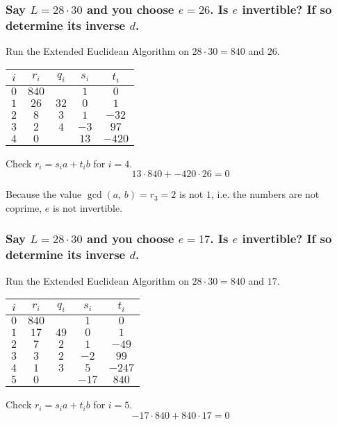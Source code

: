 \documentclass{article}
\begin{document}
  \subsubsection{Say $L = 28 \cdot 30$ and you choose $e = 26$. Is $e$ invertible? If so determine its inverse $d$.}
  Run the Extended Euclidean Algorithm on $28 \cdot 30 = 840$ and $26$.

  \begin{center}
    \begin{tabular}{c|cccc}
      $i$ & $r_i$ & $q_i$ & $s_i$ & $t_i$ \\
      \hline
      $0$ & $840$ &  & $1$ & $0$ \\
      $1$ & $26$ & $32$ & $0$ & $1$ \\
      $2$ & $8$ & $3$ & $1$ & $-32$ \\
      $3$ & $2$ & $4$ & $-3$ & $97$ \\
      $4$ & $0$ &  & $13$ & $-420$ \\
    \end{tabular}
  \end{center}
  Check $r_i = s_ia + t_ib$ for $i = 4$.
  \[ 13 \cdot 840 + -420 \cdot 26 = 0 \]

  Because the value $\gcd(a,\, b) = r_3 = 2$ is not $1$, i.e. the numbers are not coprime, $e$ is not invertible.

  \subsubsection{Say $L = 28 \cdot 30$ and you choose $e = 17$. Is $e$ invertible? If so determine its inverse $d$.}
  Run the Extended Euclidean Algorithm on $28 \cdot 30 = 840$ and $17$.

  \begin{center}
    \begin{tabular}{c|cccc}
      $i$ & $r_i$ & $q_i$ & $s_i$ & $t_i$ \\
      \hline
      $0$ & $840$ &  & $1$ & $0$ \\
      $1$ & $17$ & $49$ & $0$ & $1$ \\
      $2$ & $7$ & $2$ & $1$ & $-49$ \\
      $3$ & $3$ & $2$ & $-2$ & $99$ \\
      $4$ & $1$ & $3$ & $5$ & $-247$ \\
      $5$ & $0$ &  & $-17$ & $840$ \\
    \end{tabular}
  \end{center}
  Check $r_i = s_ia + t_ib$ for $i = 5$.
  \[ -17 \cdot 840 + 840 \cdot 17 = 0 \]
\end{document}
